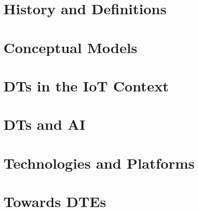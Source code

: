 \section{History and Definitions}

\section{Conceptual Models}

\section{\aclp{DT} in the \acs{IoT} Context}

\section{\aclp{DT} and \acl{AI}}

\section{Technologies and Platforms}

\section{Towards \aclp{DTE}}
